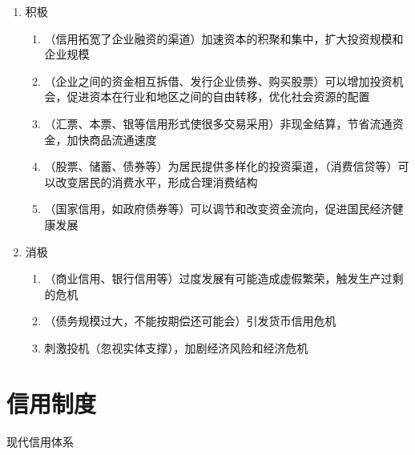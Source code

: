 \documentclass[12pt]{book}
\begin{document}
\begin{enumerate}[1.]
    \item 积极
    \begin{enumerate}[(1)]
        \item （信用拓宽了企业融资的渠道）加速资本的积聚和集中，扩大投资规模和企业规模  
        \item （企业之间的资金相互拆借、发行企业债券、购买股票）可以增加投资机会，促进资本在行业和地区之间的自由转移，优化社会资源的配置  
        \item （汇票、本票、银等信用形式使很多交易采用）非现金结算，节省流通资金，加快商品流通速度  
        \item （股票、储蓄、债券等）为居民提供多样化的投资渠道，（消费信贷等）可以改变居民的消费水平，形成合理消费结构  
        \item （国家信用，如政府债券等）可以调节和改变资金流向，促进国民经济健康发展   
    \end{enumerate}
    \item 消极
    \begin{enumerate}[(1)]
        \item （商业信用、银行信用等）过度发展有可能造成虚假繁荣，触发生产过剩的危机  
        \item （债务规模过大，不能按期偿还可能会）引发货币信用危机  
        \item 刺激投机（忽视实体支撑），加剧经济风险和经济危机
    \end{enumerate}
\end{enumerate}





\section{信用制度}


现代信用体系
\end{document}
